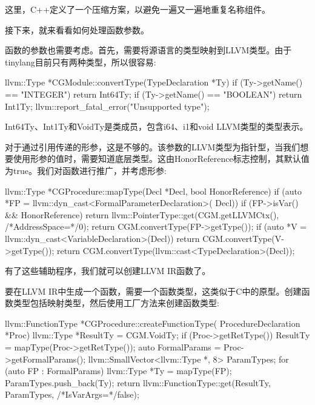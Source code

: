 这里，C++定义了一个压缩方案，以避免一遍又一遍地重复名称组件。

接下来，就来看看如何处理函数参数。


函数的参数也需要考虑。首先，需要将源语言的类型映射到LLVM类型。由于tinylang目前只有两种类型，所以很容易:

\begin{cpp}
llvm::Type *CGModule::convertType(TypeDeclaration *Ty) {
    if (Ty->getName() == "INTEGER")
        return Int64Ty;
    if (Ty->getName() == "BOOLEAN")
        return Int1Ty;
    llvm::report_fatal_error("Unsupported type");
}
\end{cpp}

Int64Ty、Int1Ty和VoidTy是类成员，包含i64、i1和void LLVM类型的类型表示。

对于通过引用传递的形参，这是不够的。该参数的LLVM类型为指针型，当我们想要使用形参的值时，需要知道底层类型。这由HonorReference标志控制，其默认值为true。我们对函数进行推广，并考虑形参:

\begin{cpp}
llvm::Type *CGProcedure::mapType(Decl *Decl,
                                 bool HonorReference) {
    if (auto *FP = llvm::dyn_cast<FormalParameterDeclaration>(
    Decl)) {
        if (FP->isVar() && HonorReference)
        return llvm::PointerType::get(CGM.getLLVMCtx(),
        /*AddressSpace=*/0);
        return CGM.convertType(FP->getType());
    }
    if (auto *V = llvm::dyn_cast<VariableDeclaration>(Decl))
        return CGM.convertType(V->getType());
    return CGM.convertType(llvm::cast<TypeDeclaration>(Decl));
}
\end{cpp}

有了这些辅助程序，我们就可以创建LLVM IR函数了。


要在LLVM IR中生成一个函数，需要一个函数类型，这类似于C中的原型。创建函数类型包括映射类型，然后使用工厂方法来创建函数类型:

\begin{cpp}
llvm::FunctionType *CGProcedure::createFunctionType(
ProcedureDeclaration *Proc) {
    llvm::Type *ResultTy = CGM.VoidTy;
    if (Proc->getRetType()) {
        ResultTy = mapType(Proc->getRetType());
    }
    auto FormalParams = Proc->getFormalParams();
    llvm::SmallVector<llvm::Type *, 8> ParamTypes;
    for (auto FP : FormalParams) {
        llvm::Type *Ty = mapType(FP);
        ParamTypes.push_back(Ty);
    }
    return llvm::FunctionType::get(ResultTy, ParamTypes,
                                    /*IsVarArgs=*/false);
}
\end{cpp}

